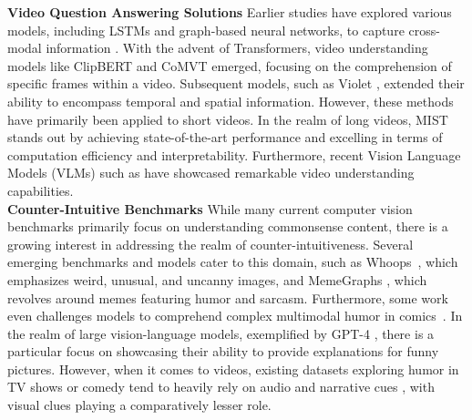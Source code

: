 \noindent\textbf{Video Question Answering Solutions}\quad
Earlier studies have explored various models, including LSTMs and graph-based neural networks, to capture cross-modal information \cite{li2019beyond, zhao2018open}. With the advent of Transformers, video understanding models like ClipBERT \cite{leiless} and CoMVT \cite{seo2021look} emerged, focusing on the comprehension of specific frames within a video. Subsequent models, such as Violet \cite{fu2021violet}, extended their ability to encompass temporal and spatial information. However, these methods have primarily been applied to short videos. In the realm of long videos, MIST \cite{gao2022mist} stands out by achieving state-of-the-art performance and excelling in terms of computation efficiency and interpretability. Furthermore, recent Vision Language Models (VLMs) such as \cite{li2023otter,2023videochat,maaz2023videochatgpt} have showcased remarkable video understanding capabilities.\\
\noindent\textbf{Counter-Intuitive Benchmarks}\quad
While many current computer vision benchmarks primarily focus on understanding commonsense content, there is a growing interest in addressing the realm of counter-intuitiveness. Several emerging benchmarks and models cater to this domain, such as Whoops~\cite{Whoop}, which emphasizes weird, unusual, and uncanny images, and MemeGraphs \cite{kougia2023memegraphs}, which revolves around memes featuring humor and sarcasm. Furthermore, some work even challenges models to comprehend complex multimodal humor in comics~\cite{hessel2022androids}. In the realm of large vision-language models, exemplified by GPT-4 \cite{openai2023gpt4}, there is a particular focus on showcasing their ability to provide explanations for funny pictures. However, when it comes to videos, existing datasets exploring humor in TV shows or comedy tend to heavily rely on audio and narrative cues \cite{mustard, hasan-etal-2019-ur,Patro_2021_WACV}, with visual clues playing a comparatively lesser role.
